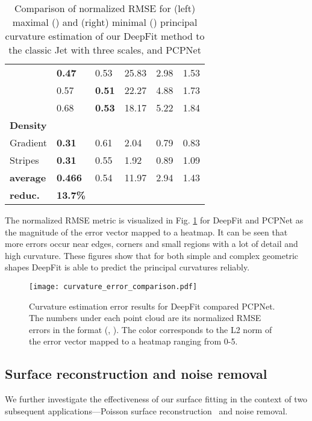 \begin{table}
{\begin{tabular}{| M{0.1\textwidth} | M{0.08\textwidth}| M{0.08\textwidth} | M{0.06\textwidth}|
		M{0.06\textwidth}|	M{0.06\textwidth}|}
              & \textbf{0.47} & 0.53 & 25.83 & 2.98 & 1.53  \\
                & 0.57 & \textbf{0.51} & 22.27 & 4.88 & 1.73  \\
                & 0.68 & \textbf{ 0.53} & 18.17 & 5.22 & 1.84 \\
            \textbf{Density}    & & & & & \\
            Gradient            & \textbf{0.31} & 0.61 &  2.04 & 0.79 & 0.83 \\
            Stripes             & \textbf{0.31 }& 0.55 &  1.92 & 0.89 & 1.09 \\
            \hline
		    \textbf{average}    & \textbf{0.466} & 0.54 & 11.97 & 2.94 & 1.43\\
		    \textbf{reduc.}    & \textbf{13.7\%} & &  &  & \\
		    \hline
		\end{tabular}
}
	\caption{Comparison of normalized RMSE for (left) maximal ()  and (right) minimal () principal curvature  estimation of our DeepFit method to the classic Jet \cite{cazals2005estimating} with three scales, and PCPNet \cite{guerrero2018pcpnet}}
	\label{table:results:curvature_baselines}
\end{table}
 
The normalized RMSE metric is visualized in Fig. \ref{fig:results_curvature_error_comparison} for DeepFit and PCPNet as the magnitude of the error vector mapped to a heatmap.  It can be seen that more errors occur near edges, corners and small regions with a lot of detail and high curvature.
These figures show that for both simple and complex geometric shapes DeepFit is able to predict the principal curvatures reliably. 

\begin{figure}
\centering
	\texttt{[image: curvature\_error\_comparison.pdf]}
	\caption{Curvature estimation error results for DeepFit compared PCPNet. The numbers under each point cloud are its normalized RMSE errors in the format (, ). The color corresponds to the L2 norm of the error vector mapped to a heatmap ranging from 0-5.}
	\label{fig:results_curvature_error_comparison} 
\end{figure}

\subsection{Surface reconstruction and noise removal}
We further investigate the effectiveness of our surface fitting in the context of two subsequent applications---Poisson surface reconstruction~\cite{kazhdan2006poisson} and noise removal.

